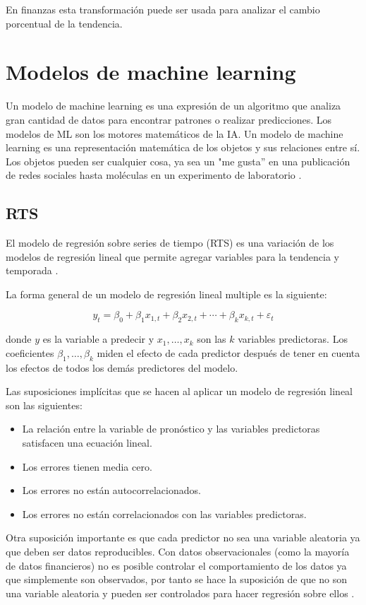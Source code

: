 En finanzas esta transformación puede ser usada para analizar el cambio porcentual de la tendencia.


\section{Modelos de machine learning}
\label{modelosmachinelearning}
Un modelo de machine learning es una expresión de un algoritmo que analiza gran cantidad de datos para encontrar patrones o realizar predicciones. Los modelos de ML son los motores matemáticos de la IA.
Un modelo de machine learning es una representación matemática de los objetos y sus relaciones entre sí. Los objetos pueden ser cualquier cosa, ya sea un "me gusta'' en una publicación de redes sociales hasta moléculas en un experimento de laboratorio \cite{parsonsQueEsModelo2021}.

\subsection{RTS}
El modelo de regresión sobre series de tiempo (RTS) es una variación de los modelos de regresión lineal que permite agregar variables para la tendencia y temporada \cite{TslmFitLinear}. 

La forma general de un modelo de regresión lineal multiple es la siguiente:

\[
y_{t}=\beta_{0}+\beta_{1} x_{1, t}+\beta_{2} x_{2, t}+\cdots+\beta_{k} x_{k, t}+\varepsilon_{t}
\]

donde $y$ es la variable a predecir y $x_{1}, \ldots, x_{k}$ son las $k$ variables predictoras.
Los coeficientes $\beta_{1}, \ldots, \beta_{k}$ miden el efecto de cada predictor después de tener en cuenta los efectos de todos los demás predictores del modelo.

Las suposiciones implícitas que se hacen al aplicar un modelo de regresión lineal son las siguientes:

\begin{itemize}
\item La relación entre la variable de pronóstico y las variables predictoras satisfacen una ecuación lineal.
\item Los errores tienen media cero.
\item Los errores no están autocorrelacionados.
\item Los errores no están correlacionados con las variables predictoras.
\end{itemize}

Otra suposición importante es que cada predictor no sea una variable aleatoria ya que deben ser datos reproducibles. Con datos observacionales (como la mayoría de datos financieros) no es posible controlar el comportamiento de los datos ya que simplemente son observados, por tanto se hace la suposición de que no son una variable aleatoria y pueden ser controlados para hacer regresión sobre ellos \cite{hyndmanForecastingPrinciplesPractice}.

